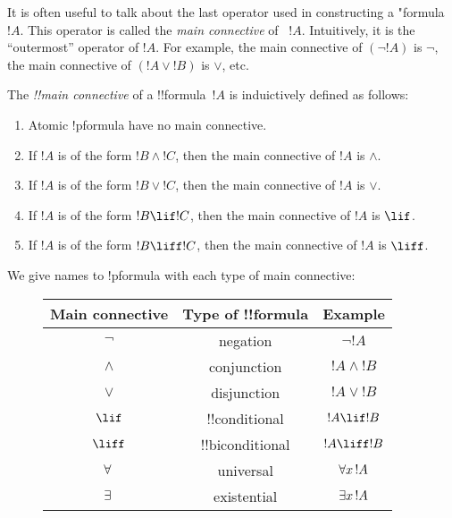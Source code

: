 \documentclass[../../include/open-logic-section]{subfiles}
\begin{document}


\begin{explain}
It is often useful to talk about the last operator used in
constructing a "{formula}~$!A$.  This operator is called the \emph{main
  connective} of ~$!A$. Intuitively, it is the ``outermost'' operator
of $!A$. For example, the main connective of $(\lnot !A)$ is $\lnot$,
the main connective of $(!A \lor !B)$ is $\lor$, etc.
\end{explain}


\begin{defn}
The \emph{!!{main connective}} of a !!{formula}~$!A$ is induictively
defined as follows:
\begin{enumerate}
\item Atomic !p{formula} have no main connective.
\item If $!A$ is of the form $!B \land !C$, then the main connective of
  $!A$ is $\land$.
\item If $!A$ is of the form $!B \lor !C$, then the main connective of
  $!A$ is $\lor$.
\item If $!A$ is of the form $!B \lif !C$, then the main connective of
  $!A$ is $\lif$.
\item If $!A$ is of the form $!B \liff !C$, then the main connective of
  $!A$ is $\liff$.
\end{enumerate}
\end{defn}

We give names to !p{formula} with each type of main connective:

\begin{figure}[!h]
\centering
\begin{tabular}{| c | c | c |}
\hline
Main connective & Type of !!{formula} & Example\\
\hline
$\lnot$ & negation & $\lnot !A$ \\
$\land$ & conjunction & $!A \land !B$ \\
$\lor$ & disjunction & $!A \lor !B$ \\
$\lif$ & !!{conditional} & $!A \lif !B$ \\
$\liff$ & !!{biconditional} & $!A \liff !B$ \\
$\lforall[][]$ & universal & $\lforall[x][!A]$ \\
$\lexists[][]$ & existential & $\lexists[x][!A]$\\ \hline
\end{tabular}
\end{figure}
\end{document}
